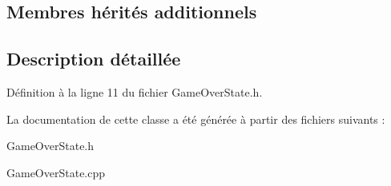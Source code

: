 \subsection*{Membres hérités additionnels}


\subsection{Description détaillée}


Définition à la ligne 11 du fichier Game\+Over\+State.\+h.



La documentation de cette classe a été générée à partir des fichiers suivants \+:\begin{DoxyCompactItemize}
\item 
Game\+Over\+State.\+h\item 
Game\+Over\+State.\+cpp\end{DoxyCompactItemize}
